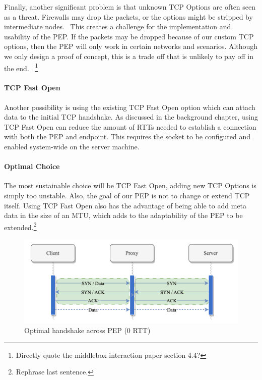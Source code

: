 \documentclass[a4paper,english, 11pt]{report}
\begin{document}
Finally, another significant problem is that unknown TCP Options are often seen as a threat. Firewalls may drop the packets, or the options might be stripped by intermediate nodes.~\cite{middlebox_interactions} This creates a challenge for the implementation and usability of the PEP. If the packets may be dropped because of our custom TCP options, then the PEP will only work in certain networks and scenarios. Although we only design a proof of concept, this is a trade off that is unlikely to pay off in the end.~\cite{tcp_extendable}
\footnote{Directly quote the middlebox interaction paper section 4.4?}

\paragraph{TCP Fast Open}
Another possibility is using the existing TCP Fast Open option which can attach data to the initial TCP handshake. As discussed in the background chapter, using TCP Fast Open can reduce the amount of RTTs needed to establish a connection with both the PEP and endpoint. This requires the socket to be configured and enabled system-wide on the server machine.\\

\paragraph{Optimal Choice}
The most sustainable choice will be TCP Fast Open, adding new TCP Options is simply too unstable. Also, the goal of our PEP is not to change or extend TCP itself. Using TCP Fast Open also has the advantage of being able to add meta data in the size of an MTU, which adds to the adaptability of the PEP to be extended.\footnote{Rephrase last sentence.}

\begin{figure} %
	\centering
	\includegraphics[scale=0.75]{../diagrams/drawio/tcphandshake_optimal.png}
  	\caption{Optimal handshake across PEP (0 RTT)}
  	\label{fig:tcphandshake_optimal}
\end{figure}
\end{document}

